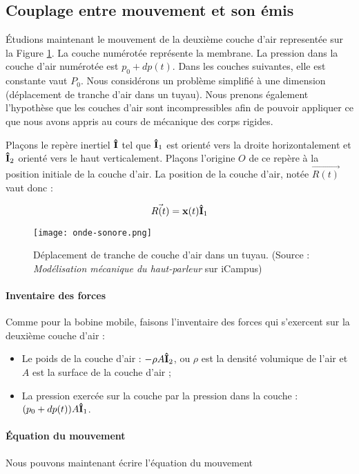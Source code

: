 \subsection{Couplage entre mouvement et son émis}
Étudions maintenant le mouvement de la deuxième couche
d'air representée sur la Figure \ref{wave-sound-scheme}.
La couche numérotée  représente la membrane.
La pression dans la couche d'air numérotée  
est $p_0 + dp(t)$. Dans les couches suivantes, elle est
constante vaut $P_0$. Nous considérons un problème simplifié
à une dimension (déplacement de tranche d'air dans un
tuyau). Nous prenons également l'hypothèse que les couches
d'air sont incompressibles afin de pouvoir appliquer
ce que nous avons appris au cours de mécanique des corps
rigides.

Plaçons le repère inertiel ${{\bf\hat{I}}}$ tel que ${\bf\hat{ I}}_1$
est orienté vers la droite horizontalement et ${\bf\hat{ I}}_2$
orienté vers le haut verticalement. Plaçons l'origine
$O$ de ce repère à la position initiale de la couche
d'air. La position de la couche d'air, notée $\vec{R(t)}$ vaut 
donc :

$$\vec{R(t)} = {\bf x}(t){\bf\hat{ I}}_1$$

\begin{figure}[ht!]
	\centering
	\texttt{[image: onde-sonore.png]}
	\caption{Déplacement de tranche de couche d'air dans un tuyau. (Source : \textit{Modélisation mécanique du haut-parleur} sur iCampus)}
	\label{wave-sound-scheme}
\end{figure}

\paragraph{Inventaire des forces}
Comme pour la bobine mobile, faisons l'inventaire
des forces qui s'exercent sur la deuxième couche d'air :

\begin{itemize}
	\item Le poids de la couche d'air : $-\rho A{\bf\hat{ I}}_2$, ou $\rho$ est la densité volumique
	de l'air et $A$ est la surface de la couche d'air ;
	\item La pression exercée sur la couche  par la pression dans la couche 
	: $(p_0 + dp(t))A {\bf\hat{ I}}_1$.
\end{itemize}

\paragraph{Équation du mouvement}
Nous pouvons maintenant écrire l'équation du mouvement


